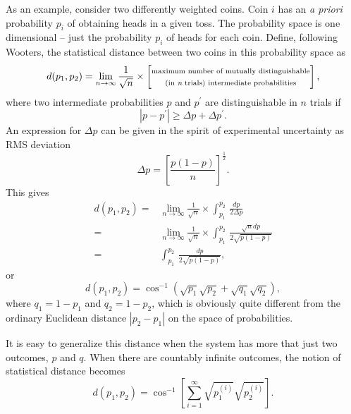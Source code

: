 As an example, consider two differently weighted coins.  Coin $i$ has
an {\it a priori} probability $p_i$ of obtaining heads in a given toss.
The probability space is one dimensional -- just the probability 
$p_i$ of heads for each coin.
Define, following Wooters\cite{Wooters:81},
the statistical distance between two coins in this probability space as
\begin{equation}
d(p_1,p_2) = \lim_{n\to\infty} \frac{1}{\sqrt{n}}\times
    \left[\begin{matrix}
        \text{\scriptsize maximum number of mutually distinguishable}\\
        \text{\scriptsize (in {\it n} trials) intermediate probabilities}
    \end{matrix}\right],
\label{e:ClassicalDistance}
\end{equation}
where two intermediate probabilities $p$ and $p^\prime$ are distinguishable
in $n$ trials if 
\begin{equation}
\left| p-p^\prime \right| \ge \Delta p + \Delta p^\prime.
\end{equation}
An expression for $\Delta p$ can be given in the spirit of experimental
uncertainty as RMS deviation
\begin{equation}
\Delta p = \left[ \frac{p(1-p)}{n} \right]^\frac{1}{2}.
\end{equation}
This gives 
\begin{equation}
\begin{split}
d(p_1,p_2) =& \lim_{n\to\infty} \frac{1}{\sqrt{n}}\times
\int_{p_1}^{p_2}\,\frac{dp}{2\Delta p}\\
=& \lim_{n\to\infty} \frac{1}{\sqrt{n}}\times
\int_{p_1}^{p_2}\,\frac{\sqrt{n}dp}{2\sqrt{p(1-p)}}\\
=& \int_{p_1}^{p_2}\,\frac{dp}{2\sqrt{p(1-p)}},
\end{split}
\end{equation}
or
\begin{equation}
d(p_1,p_2) = \cos^{-1}\left( 
    \sqrt{p_1} \sqrt{p_2} 
    +\sqrt{q_1}\sqrt{q_2}
\right),
\end{equation}
where $q_1 = 1-p_1$ and $q_2=1-p_2$,  
which is obviously quite different from the ordinary Euclidean distance 
$\left| p_2 - p_1 \right|$ on the space of probabilities.

It is easy to generalize this distance when the system has 
more that just two outcomes, $p$ and $q$.
When there are countably infinite outcomes, the notion of statistical
distance becomes
\begin{equation}
d(p_1,p_2) = \cos^{-1}\left\lbrack 
    \sum_{i=1}^\infty
    \sqrt{p^{(i)}_1} \sqrt{p^{(i)}_2} 
\right\rbrack.
\end{equation}

